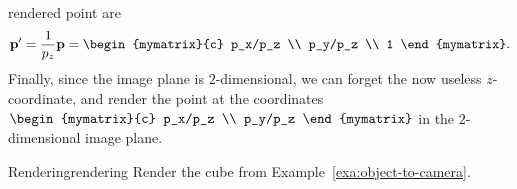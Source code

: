 rendered point are
\begin{equation*}
  \vect{p}' = \frac{1}{p_z}\vect{p} =
  \begin{mymatrix}{c} p_x/p_z \\ p_y/p_z \\ 1 \end{mymatrix}.
\end{equation*}
Finally, since the image plane is $2$-dimensional, we can forget the
now useless $z$-coordinate, and render the point at the coordinates
$\begin{mymatrix}{c} p_x/p_z \\ p_y/p_z \end{mymatrix}$ in the
$2$-dimensional image plane.

\begin{example}{Rendering}{rendering}
  Render the cube from Example~\ref{exa:object-to-camera}.
\end{example}


